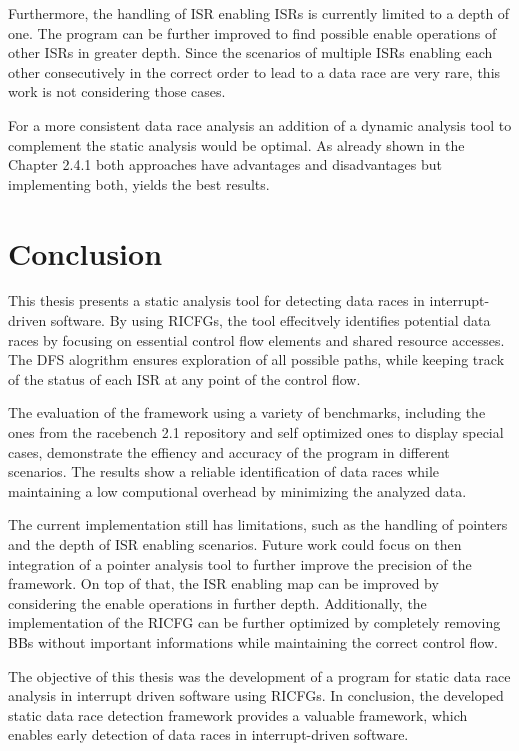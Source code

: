 \documentclass[
fancyheadings, %
%
%
]{stsreprt}
\begin{document}
{Furthermore, the handling of \ac{ISR} enabling \acp{ISR} is currently limited to a depth of one. The program can be further improved to find possible enable operations of other \acp{ISR} in greater depth. Since the scenarios of multiple \acp{ISR} enabling each other consecutively in the correct order to lead to a data race are very rare, this work is not considering those cases.

For a more consistent data race analysis an addition of a dynamic analysis tool to complement the static analysis would be optimal. As already shown in the Chapter 2.4.1 both approaches have advantages and disadvantages but implementing both, yields the best results.


 
\chapter{Conclusion}
This thesis presents a static analysis tool for detecting data races in interrupt-driven software. By using \aclp{RICFG}, the tool effecitvely identifies potential data races by focusing on essential control flow elements and shared resource accesses. The \ac{DFS} alogrithm ensures exploration of all possible paths, while keeping track of the status of each \ac{ISR} at any point of the control flow.

The evaluation of the framework using a variety of benchmarks, including the ones from the racebench 2.1 repository and self optimized ones to display special cases, demonstrate the effiency and accuracy of the program in different scenarios. The results show a reliable identification of data races while maintaining a low computional overhead by minimizing the analyzed data.

The current implementation still has limitations, such as the handling of pointers and the depth of \ac{ISR} enabling scenarios. Future work could focus on then integration of a pointer analysis tool to further improve the precision of the framework. On top of that, the \ac{ISR} enabling map can be improved by considering the enable operations in further depth. Additionally, the implementation of the \ac{RICFG} can be further optimized by completely removing \aclp{BB} without important informations while maintaining the correct control flow.

The objective of this thesis was the development of a program for static data race analysis in interrupt driven software using \aclp{RICFG}. In conclusion, the developed static data race detection framework provides a valuable framework, which enables early detection of data races in interrupt-driven software. 

}
\end{document}
